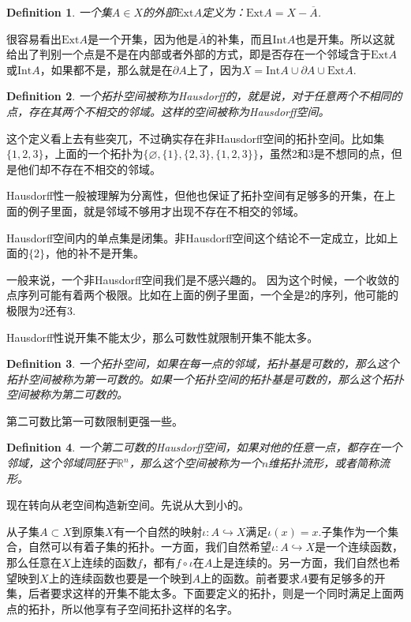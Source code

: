 \documentclass[10pt]{book}
\theoremstyle{plain}%
\newtheorem{defi}{Definition}%
\begin{document}
\begin{defi}
一个集$A \in X$的外部$\mathrm{Ext} A$定义为：$\mathrm{Ext}A=X-\overline{A}$.
\end{defi}

很容易看出$\mathrm{Ext}A$是一个开集，因为他是$\overline{A}$的补集，而且$\mathrm{Int} A$也是开集。所以这就给出了判别一个点是不是在内部或者外部的方式，即是否存在一个邻域含于$\mathrm{Ext}A$或$\mathrm{Int} A$，如果都不是，那么就是在$\partial A$上了，因为$X=\mathrm{Int} A\cup \partial A\cup \mathrm{Ext}A$.

\begin{defi}
一个拓扑空间被称为Hausdorff的，就是说，对于任意两个不相同的点，存在其两个不相交的邻域。这样的空间被称为Hausdorff空间。
\end{defi}
这个定义看上去有些突兀，不过确实存在非Hausdorff空间的拓扑空间。比如集$\{1,2,3\}$，上面的一个拓扑为$\{\varnothing,\{1\},\{2,3\},\{1,2,3\}\}$，虽然2和3是不想同的点，但是他们却不存在不相交的邻域。

Hausdorff性一般被理解为分离性，但他也保证了拓扑空间有足够多的开集，在上面的例子里面，就是邻域不够用才出现不存在不相交的邻域。

Hausdorff空间内的单点集是闭集。非Hausdorff空间这个结论不一定成立，比如上面的$\{2\}$，他的补不是开集。

一般来说，一个非Hausdorff空间我们是不感兴趣的。 因为这个时候，一个收敛的点序列可能有着两个极限。比如在上面的例子里面，一个全是2的序列，他可能的极限为2还有3.

Hausdorff性说开集不能太少，那么可数性就限制开集不能太多。
\begin{defi}
一个拓扑空间，如果在每一点的邻域，拓扑基是可数的，那么这个拓扑空间被称为第一可数的。如果一个拓扑空间的拓扑基是可数的，那么这个拓扑空间被称为第二可数的。
\end{defi}
第二可数比第一可数限制更强一些。
\begin{defi}
一个第二可数的Hausdorff空间，如果对他的任意一点，都存在一个邻域，这个邻域同胚于$\mathbb{R}^n$，那么这个空间被称为一个$n$维拓扑流形，或者简称流形。
\end{defi}

现在转向从老空间构造新空间。先说从大到小的。

从子集$A\subset X$到原集$X$有一个自然的映射$\iota: A \hookrightarrow X$满足$\iota(x)=x$.子集作为一个集合，自然可以有着子集的拓扑。一方面，我们自然希望$\iota: A \hookrightarrow X$是一个连续函数，那么任意在$X$上连续的函数$f$，都有$f\circ \iota$在$A$上是连续的。另一方面，我们自然也希望映到$X$上的连续函数也要是一个映到$A$上的函数。前者要求$A$要有足够多的开集，后者要求这样的开集不能太多。下面要定义的拓扑，则是一个同时满足上面两点的拓扑，所以他享有子空间拓扑这样的名字。
\end{document}
